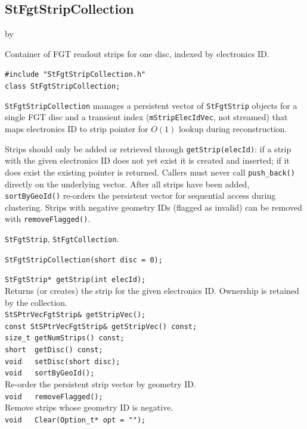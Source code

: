 \documentclass[twoside]{article}
\newcommand{\entrylabel}[1]{\mbox{\textbf{{#1}}}\hfil}%
\newenvironment{entry}
{\begin{list}{}%
    {\renewcommand{\makelabel}{\entrylabel}%
     \setlength{\labelwidth}{90pt}%
     \setlength{\leftmargin}{\labelwidth}
     \advance\leftmargin by \labelsep%
      }%
    }%
  {\end{list}}
\newcommand{\Entrylabel}[1]%
{\raisebox{0pt}[1ex][0pt]{\makebox[\labelwidth][l]%
    {\parbox[t]{\labelwidth}{\hspace{0pt}\textbf{{#1}}}}}}
\newenvironment{Entry}%
{\renewcommand{\entrylabel}{\Entrylabel}\begin{entry}}%
  {\end{entry}}
\begin{document}
\subsection{StFgtStripCollection}
\label{sec:StFgtStripCollection}
\begin{Entry}
\item[Summary] Container of FGT readout strips for one disc, indexed by electronics ID.
\item[Synopsis]
    \verb+#include "StFgtStripCollection.h"+\\
    \verb+class StFgtStripCollection;+\\
\item[Description]
  \texttt{StFgtStripCollection} manages a persistent vector of \texttt{StFgtStrip} objects
  for a single FGT disc and a transient index (\texttt{mStripElecIdVec}, not streamed)
  that maps electronics ID to strip pointer for $O(1)$ lookup during reconstruction.

  Strips should only be added or retrieved through \texttt{getStrip(elecId)}: if a strip
  with the given electronics ID does not yet exist it is created and inserted; if it does
  exist the existing pointer is returned.  Callers must never call \texttt{push\_back()}
  directly on the underlying vector.  After all strips have been added,
  \texttt{sortByGeoId()} re-orders the persistent vector for sequential access during
  clustering.  Strips with negative geometry IDs (flagged as invalid) can be removed with
  \texttt{removeFlagged()}.
\item[Related Classes]
  \texttt{StFgtStrip}, \texttt{StFgtCollection}.
\item[Public\\ Constructors]
    \verb+StFgtStripCollection(short disc = 0);+\\
\item[Public Member\\ Functions]
    \verb+StFgtStrip* getStrip(int elecId);+\\
    Returns (or creates) the strip for the given electronics ID.  Ownership is retained
    by the collection.\\[2pt]
    \verb+StSPtrVecFgtStrip& getStripVec();+\\
    \verb+const StSPtrVecFgtStrip& getStripVec() const;+\\
    \verb+size_t getNumStrips() const;+\\
    \verb+short  getDisc() const;+\\
    \verb+void   setDisc(short disc);+\\
    \verb+void   sortByGeoId();+\\
    Re-order the persistent strip vector by geometry ID.\\[2pt]
    \verb+void   removeFlagged();+\\
    Remove strips whose geometry ID is negative.\\[2pt]
    \verb+void   Clear(Option_t* opt = "");+\\
\end{Entry}
\clearpage
\end{document}
